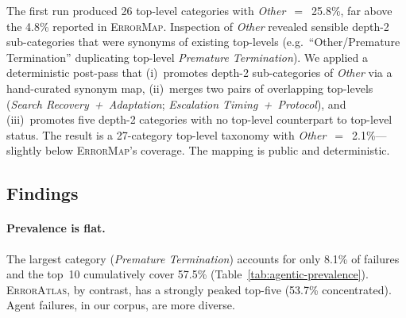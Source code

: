 The first run produced 26 top-level categories with
\emph{Other}~$=$~25.8\%, far above the 4.8\% reported in
\textsc{ErrorMap}. Inspection of \emph{Other} revealed sensible
depth-2 sub-categories that were synonyms of existing top-levels
(e.g.\ ``Other/Premature Termination'' duplicating top-level
\emph{Premature Termination}). We applied a deterministic post-pass
that (i)~promotes depth-2 sub-categories of \emph{Other} via a
hand-curated synonym map, (ii)~merges two pairs of overlapping
top-levels (\emph{Search Recovery~+~Adaptation};
\emph{Escalation Timing~+~Protocol}), and (iii)~promotes five
depth-2 categories with no top-level counterpart to top-level
status. The result is a 27-category top-level taxonomy with
\emph{Other}~$=$~2.1\%---slightly below \textsc{ErrorMap}'s
coverage. The mapping is public and deterministic.

\subsection{Findings}

\paragraph{Prevalence is flat.}
The largest category (\emph{Premature Termination}) accounts for
only 8.1\% of failures and the top~10 cumulatively cover 57.5\%
(Table~\ref{tab:agentic-prevalence}). \textsc{ErrorAtlas}, by
contrast, has a strongly peaked top-five (53.7\% concentrated). Agent
failures, in our corpus, are more diverse.

